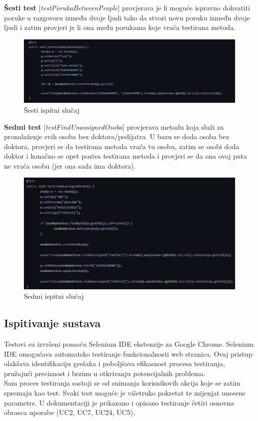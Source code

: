 		 	\noindent \textbf{Šesti test} [\textit{testPorukaBetweenPeople}] provjerava je li moguće ispravno dohvatiti poruke u razgovoru između dvoje ljudi tako da stvori novu poruku između dvoje ljudi i zatim provjeri je li ona među porukama koje vraća testirana metoda. 
		 	\begin{figure}[H]
		 		\includegraphics[width=\textwidth]{slike/junit_6.png}
		 		\caption{Šesti ispitni slučaj}
		 		\label{fig:junit_6}
		 	\end{figure}
		 	
		 	\noindent \textbf{Sedmi test} [\textit{testFindUnassignedOsoba}] provjerava metodu koja služi za pronalaženje svih osoba bez doktora/pedijatra. U bazu se doda osoba bez doktora, provjeri se da testirana metoda vraća tu osobu, zatim se osobi doda doktor i konačno se opet poziva testirana metoda i provjeri se da ona ovaj puta ne vraća osobu (jer ona sada ima doktora). 
		 	\begin{figure}[H]
		 		\includegraphics[width=\textwidth]{slike/junit_7.png}
		 		\caption{Sedmi ispitni slučaj}
		 		\label{fig:junit_7}
		 	\end{figure}
			
			\subsection{Ispitivanje sustava}
			
			Testovi su izvršeni pomoću Selenium IDE ekstenzije za Google Chrome. Selenium IDE omogućava automatsko testiranje funkcionalnosti web stranica. Ovaj pristup olakšava identifikaciju grešaka i poboljšava efikasnost procesa testiranja, pružajući preciznost i brzinu u otkrivanju potencijalnih problema.\\ 
				Sam proces testiranja sastoji se od snimanja korisnikovih akcija koje se zatim spremaju kao test. Svaki test moguće je višetruko pokretat te mijenjat unesene parametre. U dokumentaciji je prikazano i opisano testiranje četiri osnovna obrasca uporabe (UC2, UC7, UC24, UC5).\\
			
